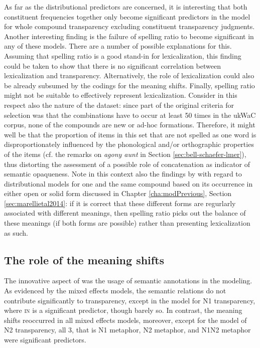 As far as the distributional predictors are concerned, it is
interesting that both constituent frequencies together only become
significant predictors in the model for whole compound transparency
excluding constituent transparency judgments. Another interesting
finding is the failure of spelling ratio to become significant in any
of these models. There are a number of possible explanations for
this. Assuming that spelling ratio is a good stand-in for
lexicalization, this finding could be taken to show that there is no significant correlation
between lexicalization and transparency. Alternatively, the role of
lexicalization could also be already subsumed
by the codings for the meaning shifts. 
Finally, spelling ratio might not be suitable
 to effectively represent lexicalization. Consider in this
respect also the nature of the dataset: since part of the original
criteria for selection was that the combinations have to occur at
least 50 times in the ukWaC corpus, none of the compounds are new or
ad-hoc formations. Therefore, it might well be that the proportion of
items in this set that are not spelled as one word is
disproportionately influenced by the phonological and/or orthographic
properties of the items (cf. the remarks on \emph{agony aunt} in
Section \ref{sec:bell-schaefer-lmer}), thus distorting the assessment
of a possible role of
concatenation as indicator of semantic opaqueness. Note in this
context also the findings by \citet{Marellietal:2014} with regard to distributional models for one
and the same compound based on its occurrence in either open or solid
form discussed in Chapter \ref{cha:modPrevious}, Section
\ref{sec:marellietal2014}: if it is correct that these different forms
are regurlarly associated with different meanings, then spelling ratio
picks out the balance of these meanings (if both forms are possible)
rather than presenting lexicalization as such.


\subsection{The role of the meaning shifts}
\label{sec:bell&schaefer2013_shifts}
The innovative aspect of \citet{BellandSchaefer:2013} was the usage of
semantic annotations in the modeling. As evidenced by the mixed
effects models, the semantic relations do not contribute significantly
to transparency, except in the model for N1 transparency, where \textsc{in}
is a significant predictor, though barely so. In contrast, the meaning shifts
reoccurred in all mixed effects models, moreover, except for the model
of N2 transparency, all 3, that is N1 metaphor, N2 metaphor, and
N1N2 metaphor were significant predictors. 

